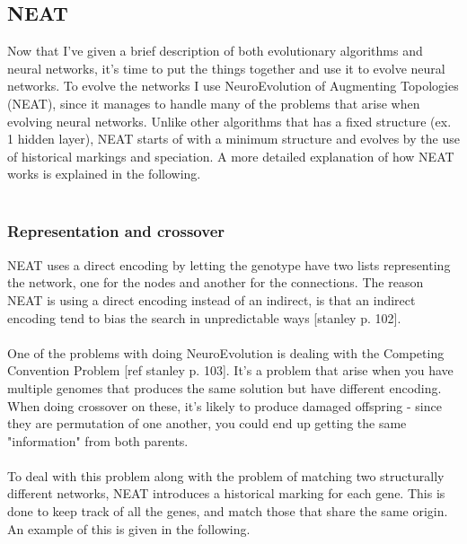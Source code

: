 \documentclass[11pt, a4paper]{article}
\begin{document}
\subsection{NEAT}
Now that I've given a brief description of both evolutionary algorithms and neural networks, it's time to put the things together and use it to evolve neural networks. To evolve the networks I use NeuroEvolution of Augmenting Topologies (NEAT), since it manages to handle many of the problems that arise when evolving neural networks. Unlike other algorithms that has a fixed structure (ex. 1 hidden layer), NEAT starts of with a minimum structure and evolves by the use of historical markings and speciation. A more detailed explanation of how NEAT works is explained in the following.
\\
\\
\subsubsection{Representation and crossover}
NEAT uses a direct encoding by letting the genotype have two lists representing the network, one for the nodes and another for the connections. The reason NEAT is using a direct encoding instead of an indirect, is that an indirect encoding tend to bias the search in unpredictable ways [stanley p. 102].
\\
\\
One of the problems with doing NeuroEvolution is dealing with the Competing Convention Problem [ref stanley p. 103]. It's a problem that arise when you have multiple genomes that produces the same solution but have different encoding. When doing crossover on these, it's likely to produce damaged offspring - since they are permutation of one another, you could end up getting the same "information" from both parents.
\\
\\
To deal with this problem along with the problem of matching two structurally different networks, NEAT introduces a historical marking for each gene. This is done to keep track of all the genes, and match those that share the same origin. An example of this is given in the following.
\end{document}
